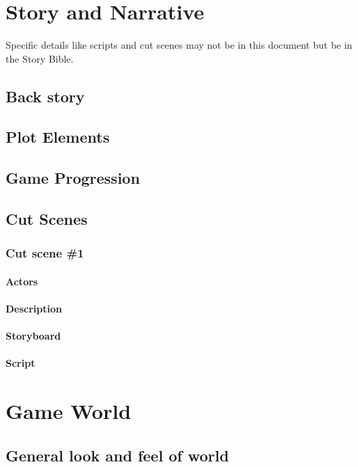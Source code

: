 \section{Story and Narrative}
Specific details like scripts and cut scenes may not be in this document but be in the Story Bible. 
\subsection{Back story}
\subsection{Plot Elements}
\subsection{Game Progression}
\subsection{Cut Scenes}
\subsubsection{Cut scene \#1}
\paragraph{Actors}
\paragraph{Description}
\paragraph{Storyboard}
\paragraph{Script}

\section{Game World}
\subsection{General look and feel of world}
